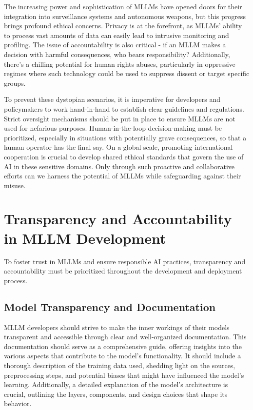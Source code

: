 The increasing power and sophistication of MLLMs have opened doors for their integration into surveillance systems and autonomous weapons, but this progress brings profound ethical concerns. Privacy is at the forefront, as MLLMs' ability to process vast amounts of data can easily lead to intrusive monitoring and profiling. The issue of accountability is also critical - if an MLLM makes a decision with harmful consequences, who bears responsibility? Additionally, there's a chilling potential for human rights abuses, particularly in oppressive regimes where such technology could be used to suppress dissent or target specific groups.

To prevent these dystopian scenarios, it is imperative for developers and policymakers to work hand-in-hand to establish clear guidelines and regulations. Strict oversight mechanisms should be put in place to ensure MLLMs are not used for nefarious purposes. Human-in-the-loop decision-making must be prioritized, especially in situations with potentially grave consequences, so that a human operator has the final say. On a global scale, promoting international cooperation is crucial to develop shared ethical standards that govern the use of AI in these sensitive domains. Only through such proactive and collaborative efforts can we harness the potential of MLLMs while safeguarding against their misuse.

\section{Transparency and Accountability in MLLM Development}

To foster trust in MLLMs and ensure responsible AI practices, transparency and accountability must be prioritized throughout the development and deployment process.

\subsection{Model Transparency and Documentation}

MLLM developers should strive to make the inner workings of their models transparent and accessible through clear and well-organized documentation. This documentation should serve as a comprehensive guide, offering insights into the various aspects that contribute to the model's functionality. It should include a thorough description of the training data used, shedding light on the sources, preprocessing steps, and potential biases that might have influenced the model's learning. Additionally, a detailed explanation of the model's architecture is crucial, outlining the layers, components, and design choices that shape its behavior.


